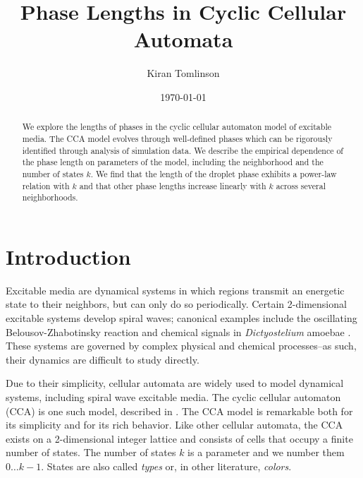 \documentclass[%
 reprint,
 amsmath,amssymb,
 aps,
]{revtex4-1}
\begin{document}

\title{Phase Lengths in Cyclic Cellular Automata}%

\author{Kiran Tomlinson}
%

\date{\today}%

\begin{abstract}
We explore the lengths of phases in the cyclic cellular automaton model of excitable media. The CCA model evolves through well-defined phases which can be rigorously identified through analysis of simulation data. We describe the empirical dependence of the phase length on parameters of the model, including the neighborhood and the number of states $k$. We find that the length of the droplet phase exhibits a power-law relation with $k$ and that other phase lengths increase linearly with $k$ across several neighborhoods.  
\end{abstract}

\maketitle


\section{\label{sec:intro}Introduction}
Excitable media are dynamical systems in which regions transmit an energetic state to their neighbors, but can only do so periodically. Certain 2-dimensional excitable systems develop spiral waves; canonical examples include the oscillating Belousov-Zhabotinsky reaction \cite{Keener1986} and chemical signals in \emph{Dictyostelium} amoebae \cite{Palsson1997}. These systems are governed by complex physical and chemical processes--as such, their dynamics are difficult to study directly.

Due to their simplicity, cellular automata are widely used to model dynamical systems, including spiral wave excitable media. The cyclic cellular automaton (CCA) is one such model, described in \cite{Fisch1991}. The CCA model is remarkable both for its simplicity and for its rich behavior. Like other cellular automata, the CCA exists on a 2-dimensional integer lattice and consists of cells that occupy a finite number of states. The number of states $k$ is a parameter and we number them $0 \dots k-1$. States are also called \emph{types} or, in other literature, \emph{colors}.
\end{document}

